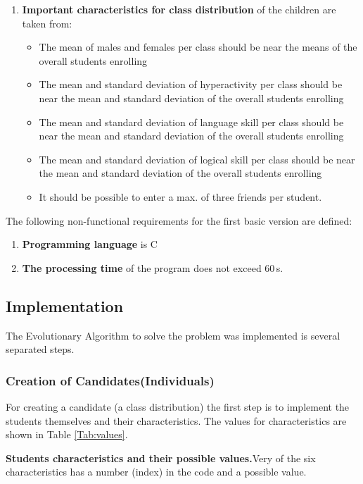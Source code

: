 \begin{onehalfspace}
\begin{enumerate}
  \item \textbf{Important characteristics for class distribution} of the children are taken from:
  
   \begin{itemize}
        \item The mean of males and females per class should be near the means of the overall students enrolling
        \item The mean and standard deviation of hyperactivity per class should be near the mean and standard deviation  of the overall students enrolling
        \item The mean and standard deviation  of language skill per class should be near the mean and standard deviation  of the overall students enrolling
        \item The mean and standard deviation  of logical skill per class should be near the mean and standard deviation  of the overall students enrolling
        \item It should be possible to enter a max. of three friends per student. 
    \end{itemize}
\end{enumerate}

The following non-functional requirements for the first basic version are defined:

\begin{enumerate}
  \item \textbf{Programming language} is C
  \item \textbf{The processing time} of the program does not exceed 60\,s.
\end{enumerate}


\subsection{Implementation}
The Evolutionary Algorithm to solve the problem was implemented is several separated steps.
\subsubsection{Creation of Candidates(Individuals)}
For creating a candidate (a class distribution) the first step is to implement the students themselves and their characteristics. The values for characteristics are shown in Table \ref{Tab:values}.


\begin{table} [H]
    \centering
    \caption[Students characteristics and their possible values.]{\textbf{Students characteristics and their possible values.}Very of the six characteristics has a number (index) in the code and a possible value.}


\end{table}
\end{onehalfspace}

